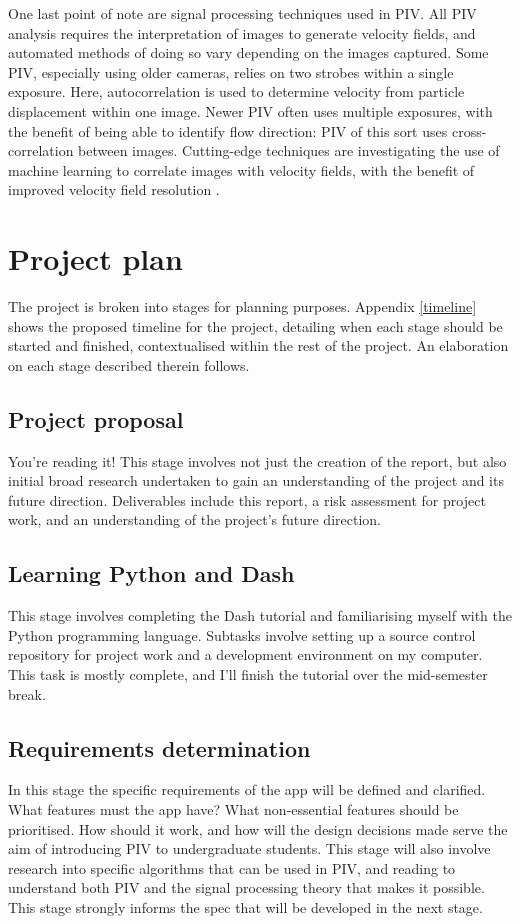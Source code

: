 \documentclass[12pt, a4paper]{amsart}
\begin{document}
One last point of note are signal processing techniques used in PIV. All PIV analysis requires the interpretation of images to generate velocity fields, and automated methods of doing so vary depending on the images captured. Some PIV, especially using older cameras, relies on two strobes within a single exposure. Here, autocorrelation is used to determine velocity from particle displacement within one image. Newer PIV often uses multiple exposures, with the benefit of being able to identify flow direction: PIV of this sort uses cross-correlation between images. Cutting-edge techniques are investigating the use of machine learning to correlate images with velocity fields, with the benefit of improved velocity field resolution \citep{wikipiv}.


\section{Project plan}

The project is broken into stages for planning purposes. Appendix \ref{timeline} shows the proposed timeline for the project, detailing when each stage should be started and finished, contextualised within the rest of the project. An elaboration on each stage described therein follows.

\subsection{Project proposal}
You're reading it! This stage involves not just the creation of the report, but also initial broad research undertaken to gain an understanding of the project and its future direction. Deliverables include this report, a risk assessment for project work, and an understanding of the project's future direction.

\subsection{Learning Python and Dash}
This stage involves completing the Dash tutorial \citep{dashtut} and familiarising myself with the Python programming language. Subtasks involve setting up a source control repository for project work and a development environment on my computer. This task is mostly complete, and I'll finish the tutorial over the mid-semester break. 

\subsection{Requirements determination}
In this stage the specific requirements of the app will be defined and clarified. What features must the app have? What non-essential features should be prioritised. How should it work, and how will the design decisions made serve the aim of introducing PIV to undergraduate students. This stage will also involve research into specific algorithms that can be used in PIV, and reading to understand both PIV and the signal processing theory that makes it possible. This stage strongly informs the spec that will be developed in the next stage.
\end{document}
